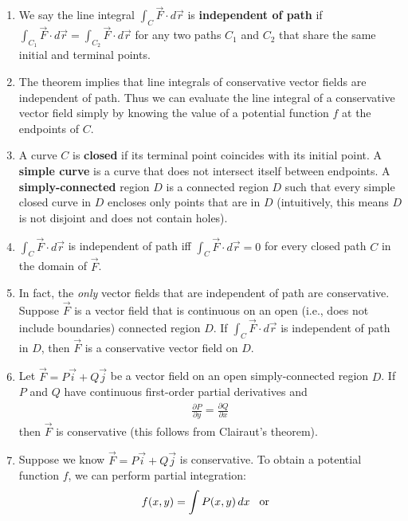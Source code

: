 \documentclass[10pt]{article}
\begin{document}
\begin{multicols}{2}
\begin{enumerate}
\begin{enumerate}
        \item We say the line integral $\int_C \vec{F} \cdot d\vec{r}$ is \textbf{independent of path} if $\int_{C_1} \vec{F} \cdot d\vec{r} = \int_{C_2} \vec{F} \cdot d\vec{r}$ for any two paths $C_1$ and $C_2$ that share the same initial and terminal points. 
        \item The theorem implies that line integrals of conservative vector fields are independent of path. Thus we can evaluate the line integral of a conservative vector field simply by knowing the value of a potential function $f$ at the endpoints of $C$.
        \item A curve $C$ is \textbf{closed} if its terminal point coincides with its initial point. A \textbf{simple curve} is a curve that does not intersect itself between endpoints. A \textbf{simply-connected} region $D$ is a connected region $D$ such that every simple closed curve in $D$ encloses only points that are in $D$ (intuitively, this means $D$ is not disjoint and does not contain holes).
        \item $\int_C \vec{F} \cdot d\vec{r}$ is independent of path iff $\int_C \vec{F} \cdot d\vec{r}=0$ for every closed path $C$ in the domain of $\vec{F}$.
        \item In fact, the \textit{only} vector fields that are independent of path are conservative. Suppose $\vec{F}$ is a vector field that is continuous on an open (i.e., does not include boundaries) connected region $D$. If $\int_C \vec{F} \cdot d\vec{r}$ is independent of path in $D$, then $\vec{F}$ is a conservative vector field on $D$.
        \item Let $\vec{F} = P\vec{i} + Q\vec{j}$ be a vector field on an open simply-connected region $D$. If $P$ and $Q$ have continuous first-order partial derivatives and  
        \begin{align*}
            \frac{\partial P}{\partial y} = \frac{\partial Q}{\partial x} 
        \end{align*}
        then $\vec{F}$ is conservative (this follows from Clairaut's theorem).
        \item Suppose we know $\vec{F} = P\vec{i} + Q\vec{j}$ is conservative. To obtain a potential function $f$, we can perform partial integration:
        \begin{align*}
            f(x,y) = \int P(x,y) \,dx \hspace{3mm} \text{or} \hspace{3mm}

\end{align*}
\end{enumerate}
\end{enumerate}
\end{multicols}
\end{document}
